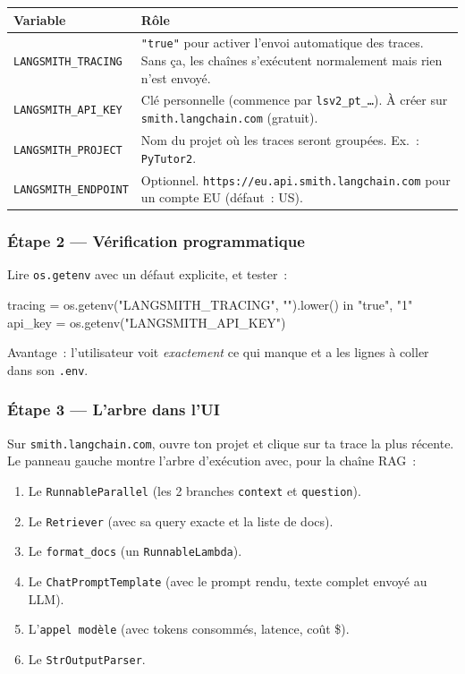 \documentclass[11pt,a4paper]{article}
\begin{document}
\begin{center}
\begin{tabular}{p{4.5cm} p{10cm}}
\toprule
\textbf{Variable} & \textbf{Rôle} \\
\midrule
\texttt{LANGSMITH\_TRACING}
& \texttt{"true"} pour activer l'envoi automatique des traces. Sans ça,
  les chaînes s'exécutent normalement mais rien n'est envoyé. \\[1mm]
\texttt{LANGSMITH\_API\_KEY}
& Clé personnelle (commence par \texttt{lsv2\_pt\_\dots}). À créer sur
  \texttt{smith.langchain.com} (gratuit). \\[1mm]
\texttt{LANGSMITH\_PROJECT}
& Nom du projet où les traces seront groupées. Ex.~: \texttt{PyTutor2}. \\[1mm]
\texttt{LANGSMITH\_ENDPOINT} & Optionnel.
\texttt{https://eu.api.smith.langchain.com} pour un compte EU
(défaut~: US). \\
\bottomrule
\end{tabular}
\end{center}

\subsubsection*{Étape 2 — Vérification programmatique}

Lire \texttt{os.getenv} avec un défaut explicite, et tester~:

\begin{pythoncode}
tracing = os.getenv("LANGSMITH_TRACING", "").lower() in {"true", "1"}
api_key = os.getenv("LANGSMITH_API_KEY")
\end{pythoncode}

Avantage~: l'utilisateur voit \emph{exactement} ce qui manque et a les
lignes à coller dans son \texttt{.env}.

\subsubsection*{Étape 3 — L'arbre dans l'UI}

Sur \texttt{smith.langchain.com}, ouvre ton projet et clique sur ta
trace la plus récente. Le panneau gauche montre l'arbre d'exécution
avec, pour la chaîne RAG~:

\begin{enumerate}[leftmargin=*]
  \item Le \texttt{RunnableParallel} (les 2 branches \texttt{context}
        et \texttt{question}).
  \item Le \texttt{Retriever} (avec sa query exacte et la liste de docs).
  \item Le \texttt{format\_docs} (un \texttt{RunnableLambda}).
  \item Le \texttt{ChatPromptTemplate} (avec le prompt rendu, texte
        complet envoyé au LLM).
  \item L'\texttt{appel modèle} (avec tokens consommés, latence, coût \$).
  \item Le \texttt{StrOutputParser}.
\end{enumerate}
\end{document}
